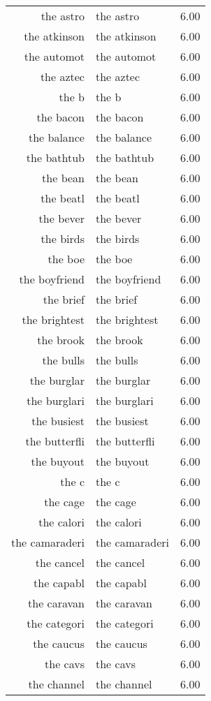 \begin{table}[ht]
\begin{tabular}{rlr}
  the astro & the astro & 6.00 \\ 
  the atkinson & the atkinson & 6.00 \\ 
  the automot & the automot & 6.00 \\ 
  the aztec & the aztec & 6.00 \\ 
  the b & the b & 6.00 \\ 
  the bacon & the bacon & 6.00 \\ 
  the balance & the balance & 6.00 \\ 
  the bathtub & the bathtub & 6.00 \\ 
  the bean & the bean & 6.00 \\ 
  the beatl & the beatl & 6.00 \\ 
  the bever & the bever & 6.00 \\ 
  the birds & the birds & 6.00 \\ 
  the boe & the boe & 6.00 \\ 
  the boyfriend & the boyfriend & 6.00 \\ 
  the brief & the brief & 6.00 \\ 
  the brightest & the brightest & 6.00 \\ 
  the brook & the brook & 6.00 \\ 
  the bulls & the bulls & 6.00 \\ 
  the burglar & the burglar & 6.00 \\ 
  the burglari & the burglari & 6.00 \\ 
  the busiest & the busiest & 6.00 \\ 
  the butterfli & the butterfli & 6.00 \\ 
  the buyout & the buyout & 6.00 \\ 
  the c & the c & 6.00 \\ 
  the cage & the cage & 6.00 \\ 
  the calori & the calori & 6.00 \\ 
  the camaraderi & the camaraderi & 6.00 \\ 
  the cancel & the cancel & 6.00 \\ 
  the capabl & the capabl & 6.00 \\ 
  the caravan & the caravan & 6.00 \\ 
  the categori & the categori & 6.00 \\ 
  the caucus & the caucus & 6.00 \\ 
  the cavs & the cavs & 6.00 \\ 
  the channel & the channel & 6.00 \\ 

\end{tabular}
\end{table}
